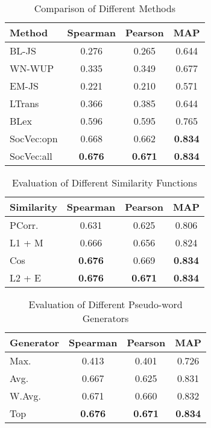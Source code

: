 \begin{table}[th]
	\small
	\centering
	\caption{{Comparison of Different Methods}}
	\begin{tabular}{|l|c|c|c|}
		\hline
		\textbf{Method} & \textbf{Spearman} & \textbf{Pearson}  & \textbf{MAP} \\ \hline\hline
		BL-JS& 0.276 & 0.265 & 0.644   \\ \hline
		WN-WUP  & 0.335 & 0.349 & 0.677 \\ \hline
		EM-JS & 0.221 & 0.210  & 0.571\\ \hline
		LTrans& 0.366 & 0.385  & 0.644  \\ \hline
		BLex& 0.596 & 0.595  & 0.765 \\ \hline\hline
		SocVec:opn& 0.668 & 0.662   & \textbf{0.834} \\ \hline
		SocVec:all& \textbf{0.676} & \textbf{0.671}  & \textbf{0.834}\\ \hline
	\end{tabular}
	\label{tab:mcdne_res_1}
\end{table}
\begin{table}[th]
	\centering
	\small
	\caption{{Evaluation of Different Similarity Functions}}
	\label{tab:mcdne_res_2}
	\begin{tabular}{|l|c|c|c|}
		\hline
		\textbf{Similarity} & \textbf{Spearman} & \textbf{Pearson}   & \textbf{MAP} \\ \hline\hline
		PCorr. & 0.631 & 0.625 & 0.806\\ \hline
		L1 + M & 0.666 & 0.656 & 0.824 \\  \hline
		Cos & \textbf{0.676} & 0.669 & \textbf{0.834} \\ \hline
		L2 + E & \textbf{0.676} & \textbf{0.671} & \textbf{0.834} \\ \hline
	\end{tabular}
\end{table}

\begin{table}[th]
	\centering
	\small
	\caption{{Evaluation of Different Pseudo-word Generators}}
	\begin{tabular}{|l|c|c|c|}
		\hline
		\textbf{Generator} & \textbf{Spearman} & \textbf{Pearson}   & \textbf{MAP} \\ \hline \hline
		Max. & 0.413 & 0.401 & 0.726\\ \hline
		Avg. & 0.667 & 0.625 & 0.831\\ \hline
		W.Avg. & 0.671 & 0.660 & 0.832 \\  \hline
		Top & \textbf{0.676} & \textbf{0.671} & \textbf{0.834} \\ \hline
	\end{tabular}
	\label{tab:mcdne_res_3}
\end{table}

